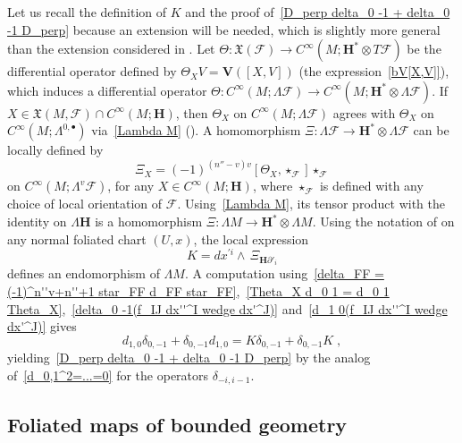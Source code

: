 \documentclass{memo-l}
\theoremstyle{plain}
\theoremstyle{definition}
\theoremstyle{remark}
\newcommand{\FF}{\mathcal{F}}
\newcommand{\fX}{\mathfrak{X}}
\newcommand{\bfH}{\boldsymbol{H}}
\newcommand{\bfV}{\boldsymbol{V}}
\numberwithin{section}{chapter}
\numberwithin{equation}{section}%
\begin{document}
Let us recall the definition of $K$ and the proof of~\eqref{D_perp delta_0 -1 + delta_0 -1 D_perp} because an extension will be needed, which is slightly more general than the extension considered in \cite[Section~11]{AlvKordyLeichtnam2020}. Let $\Theta:\fX(\FF)\to C^\infty(M;\bfH^*\otimes T\FF)$ be the differential operator defined by $\Theta_XV=\bfV([X,V])$ (the expression~\eqref{bV[X,V]}), which induces a differential operator $\Theta:C^\infty(M;\Lambda\FF)\to C^\infty(M;\bfH^*\otimes\Lambda\FF)$. If $X\in\fX(M,\FF)\cap C^\infty(M;\bfH)$, then $\Theta_X$ on $C^\infty(M;\Lambda\FF)$ agrees with $\Theta_X$ on $C^\infty(M;\Lambda^{0,{\bullet}})$ via~\eqref{Lambda M} (). A homomorphism $\Xi:\Lambda\FF\to \bfH^*\otimes\Lambda\FF$ can be locally defined by
\[
\Xi_X=(-1)^{(n''-v)v}[\Theta_X,\star_\FF]\star_\FF
\]
on $C^\infty(M;\Lambda^v\FF)$, for any $X\in C^\infty(M;\bfH)$, where $\star_\FF$ is defined with any choice of local orientation of $\FF$. Using~\eqref{Lambda M}, its tensor product with the identity on $\Lambda\bfH$ is a homomorphism $\Xi:\Lambda M\to \bfH^*\otimes\Lambda M$. Using the notation of  on any normal foliated chart $(U,x)$, the local expression
\[
K={dx^{\prime i}\wedge}\,\Xi_{\bfH\partial'_i}
\]
defines an endomorphism of $\Lambda M$. A computation using~\eqref{delta_FF = (-1)^n''v+n''+1 star_FF d_FF star_FF},~\eqref{Theta_X d_0 1 = d_0 1 Theta_X},~\eqref{delta_0 -1(f_IJ dx''^I wedge dx'^J)} and~\eqref{d_1 0(f_IJ dx''^I wedge dx'^J)} gives
\begin{equation}\label{d_1 0 delta_0 -1 + delta_0 -1 d_1 0}
d_{1,0}\delta_{0,-1}+\delta_{0,-1}d_{1,0}=K\delta_{0,-1}+\delta_{0,-1}K\;,
\end{equation}
yielding~\eqref{D_perp delta_0 -1 + delta_0 -1 D_perp} by the analog of~\eqref{d_0,1^2=...=0} for the operators $\delta_{-i,i-1}$.



\subsection{Foliated maps of bounded geometry}
\label{ss: foliated maps of bd geom}
\end{document}
